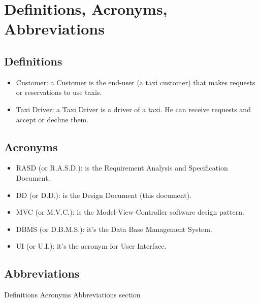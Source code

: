 \documentclass[../../../../dd.tex]{subfiles}
\begin{document}
	\section{Definitions, Acronyms, Abbreviations}

		\subsection{Definitions}
			\begin{itemize}
				\item Customer: a Customer is the end-user (a taxi customer) that makes requests or reservations to use taxis.
				\item Taxi Driver: a Taxi Driver is a driver of a taxi. He can receive requests and accept or decline them.
			\end{itemize}

		\subsection{Acronyms}
			\begin{itemize}
				\item RASD (or R.A.S.D.): is the Requirement Analysis and Specification Document.
				\item DD (or D.D.): is the Design Document (this document).
				\item MVC (or M.V.C.): is the Model-View-Controller software design pattern.
				\item DBMS (or D.B.M.S.): it's the Data Base Management System.
				\item UI (or U.I.): it's the acronym for User Interface.
			\end{itemize}

		\subsection{Abbreviations}

	Definitions Acronyms Abbreviations section
\end{document}
